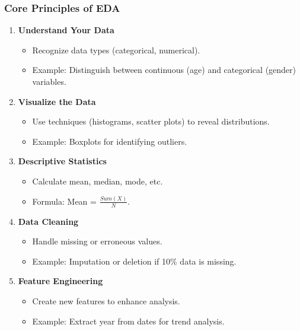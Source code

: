 \documentclass{beamer}
\begin{document}
\begin{frame}[fragile]
    \frametitle{Core Principles of EDA}
    
    \begin{enumerate}
        \item \textbf{Understand Your Data}
            \begin{itemize}
                \item Recognize data types (categorical, numerical).
                \item Example: Distinguish between continuous (age) and categorical (gender) variables.
            \end{itemize}
        
        \item \textbf{Visualize the Data}
            \begin{itemize}
                \item Use techniques (histograms, scatter plots) to reveal distributions.
                \item Example: Boxplots for identifying outliers.
            \end{itemize}
        
        \item \textbf{Descriptive Statistics}
            \begin{itemize}
                \item Calculate mean, median, mode, etc.
                \item Formula: Mean = $\frac{Sum(X)}{N}$.
            \end{itemize}
        
        \item \textbf{Data Cleaning}
            \begin{itemize}
                \item Handle missing or erroneous values.
                \item Example: Imputation or deletion if 10\% data is missing.
            \end{itemize}
        
        \item \textbf{Feature Engineering}
            \begin{itemize}
                \item Create new features to enhance analysis.
                \item Example: Extract year from dates for trend analysis.
            \end{itemize}
    \end{enumerate}
\end{frame}
\end{document}
